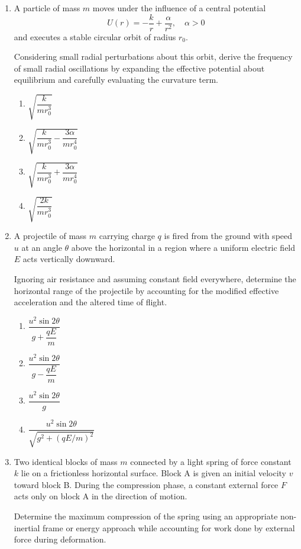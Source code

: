 \documentclass[12pt]{article}
\begin{document}
\begin{enumerate}
\item
A particle of mass $m$ moves under the influence of a central potential
\[
U(r)=-\frac{k}{r}+\frac{\alpha}{r^2}, \quad \alpha>0
\]
and executes a stable circular orbit of radius $r_0$.

Considering small radial perturbations about this orbit, derive the frequency of small radial oscillations by expanding the effective potential about equilibrium and carefully evaluating the curvature term.

\begin{enumerate}
\item $\sqrt{\dfrac{k}{mr_0^3}}$
\item $\sqrt{\dfrac{k}{mr_0^3}-\dfrac{3\alpha}{mr_0^4}}$
\item $\sqrt{\dfrac{k}{mr_0^3}+\dfrac{3\alpha}{mr_0^4}}$
\item $\sqrt{\dfrac{2k}{mr_0^3}}$
\end{enumerate}

\item
A projectile of mass $m$ carrying charge $q$ is fired from the ground with speed $u$ at an angle $\theta$ above the horizontal in a region where a uniform electric field $E$ acts vertically downward.

Ignoring air resistance and assuming constant field everywhere, determine the horizontal range of the projectile by accounting for the modified effective acceleration and the altered time of flight.

\begin{enumerate}
\item $\dfrac{u^2\sin2\theta}{g+\dfrac{qE}{m}}$
\item $\dfrac{u^2\sin2\theta}{g-\dfrac{qE}{m}}$
\item $\dfrac{u^2\sin2\theta}{g}$
\item $\dfrac{u^2\sin2\theta}{\sqrt{g^2+(qE/m)^2}}$
\end{enumerate}

\item
Two identical blocks of mass $m$ connected by a light spring of force constant $k$ lie on a frictionless horizontal surface. Block A is given an initial velocity $v$ toward block B. During the compression phase, a constant external force $F$ acts only on block A in the direction of motion.

Determine the maximum compression of the spring using an appropriate non-inertial frame or energy approach while accounting for work done by external force during deformation.


\end{enumerate}
\end{document}
